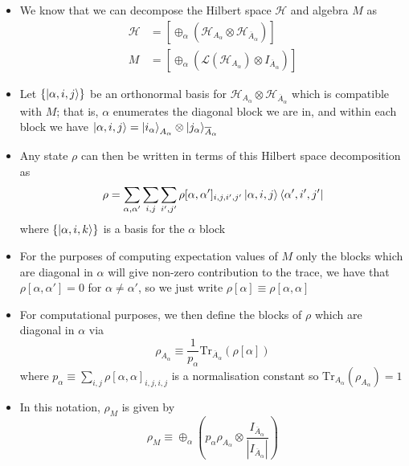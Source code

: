 \documentclass[12pt,a4paper]{article}
\numberwithin{equation}{section}
\theoremstyle{definition}
\theoremstyle{theorem}
\theoremstyle{example}
\begin{document}
\begin{itemize}
		\item We know that we can decompose the Hilbert space $\mathcal{H}$ and algebra $M$ as
		\begin{equation}
			\begin{aligned}
				\mathcal{H}&=\left[\oplus_{\alpha}\left(\mathcal{H}_{A_{\alpha}}\otimes\mathcal{H}_{\overline{A}_{\alpha}}\right)\right]\\
				M&=\left[\oplus_{\alpha}\left(\mathcal{L}(\mathcal{H}_{A_{\alpha}})\otimes I_{\overline{A}_{\alpha}}\right)\right]
			\end{aligned}
		\end{equation}
		\item Let $\{\ket{\alpha,i,j}\}$ be an orthonormal basis for $\mathcal{H}_{A_{\alpha}}\otimes\mathcal{H}_{\overline{A}_{\alpha}}$ which is compatible with $M$; that is, $\alpha$ enumerates the diagonal block we are in, and within each block we have $\ket{\alpha,i,j}=\ket{i_{\alpha}}_{A_{\alpha}}\otimes\ket{j_{\alpha}}_{\overline{A}_{\alpha}}$
		\item Any state $\rho$ can then be written in terms of this Hilbert space decomposition as
		\begin{equation}
			\rho=\sum_{\alpha,\alpha'}\sum_{i,j}\sum_{i',j'}\rho[\alpha,\alpha']_{i,j,i',j'}\ket{\alpha,i,j}\bra{\alpha',i',j'}
		\end{equation}
		where $\{\ket{\alpha,i,k}\}$ is a basis for the $\alpha$ block
		\item For the purposes of computing expectation values of $M$ only the blocks which are diagonal in $\alpha$ will give non-zero contribution to the trace, we have that $\rho[\alpha,\alpha']=0$ for $\alpha\neq\alpha'$, so we just write $\rho[\alpha]\equiv\rho[\alpha,\alpha]$
		\item For computational purposes, we then define the blocks of $\rho$ which are diagonal in $\alpha$ via
		\begin{equation}
			\rho_{A_{\alpha}}\equiv\frac{1}{p_{\alpha}}\text{Tr}_{\overline{A}_{\alpha}}(\rho[\alpha])
		\end{equation}
		where $p_{\alpha}\equiv\sum_{i,j}\rho[\alpha,\alpha]_{i,j,i,j}$ is a normalisation constant so $\text{Tr}_{A_{\alpha}}(\rho_{A_{\alpha}})=1$
		\item In this notation, $\rho_{M}$ is given by
		\begin{equation}
			\rho_{M}\equiv\oplus_{\alpha}\left(p_{\alpha}\rho_{A_{\alpha}}\otimes\frac{I_{\overline{A}_{\alpha}}}{|I_{\overline{A}_{\alpha}}|}\right)
		\end{equation}

\end{itemize}
\end{document}
